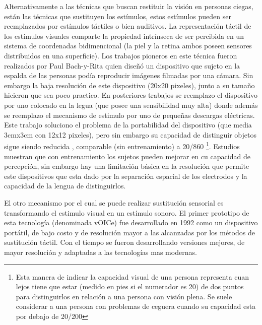 \documentclass{article}
\begin{document}
    Alternativamente a las técnicas que buscan restituir la visión en personas ciegas, están las técnicas que sustituyen los estímulos, estos estímulos pueden ser reemplazados por estímulos táctiles o bien auditivos. La representación táctil de los estímulos visuales comparte la propiedad intrínseca de ser percibida en un sistema de coordenadas bidimencional (la piel y la retina ambos poseen sensores distribuidos en una superficie). Los trabajos pioneros en este técnica fueron realizados por Paul Bach-y-Rita \cite{Tactil1} quien diseñó un dispositivo que sujeto en la espalda de las personas podía reproducir imágenes filmadas por una cámara. Sin embargo la baja resolución de este dispositivo (20x20 pixeles), junto a su tamaño hicieron que sea poco practico. En posteriores trabajos \cite{Tactil2} se reemplazo el dispositivo por uno colocado en la legua (que posee una sensibilidad muy alta) donde además se reemplazo el mecanismo de estimulo por uno de pequeñas descargas eléctricas. Este trabajo soluciono el problema de la portabilidad del dispositivo (que media 3cmx3cm con 12x12 pixeles), pero sin embargo su capacidad de distinguir objetos sigue siendo reducida \cite{Tactil3}, comparable (sin entrenamiento) a 20/860 \footnote{Esta manera de indicar la capacidad visual de una persona representa cuan lejos tiene que estar (medido en pies si el numerador es 20) de dos puntos para distinguirlos en relación a una persona con visión plena. Se suele considerar a una persona con problemas de ceguera cuando su capacidad esta por debajo de 20/200}. Estudios \cite{Tactil4} muestran que con entrenamiento los sujetos pueden mejorar en cu capacidad de percepción, sin embargo hay una limitación básica en la resolución que permite este dispositivos que esta dado por la separación espacial de los electrodos y la capacidad de la lengua de distinguirlos. 
    
    El otro mecanismo por el cual se puede realizar sustitución sensorial es transformando el estimulo visual en un estímulo sonoro. El primer prototipo de esta tecnología (denominada vOICe) fue desarrollado en 1992 \cite{Voice1} como un dispositivo portátil, de bajo costo y de resolución mayor a las alcanzadas por los métodos de sustitución táctil. Con el tiempo se fueron desarrollando versiones mejores, de mayor resolución y adaptadas a las tecnologías mas modernas.
    
\end{document}
